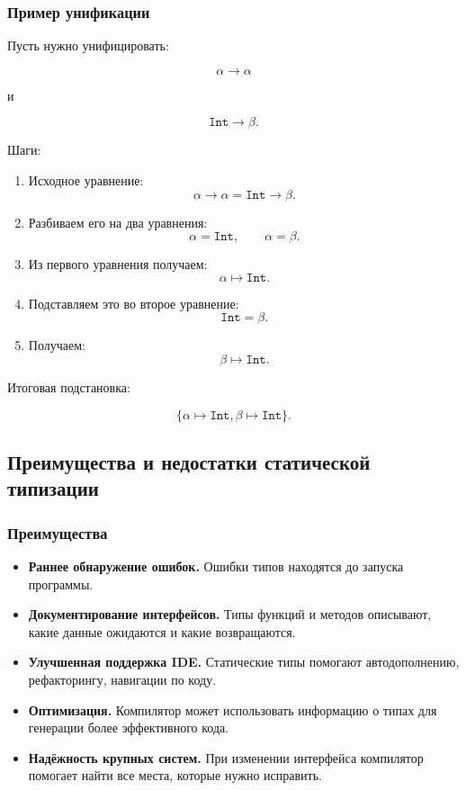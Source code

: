 \documentclass[12pt,a4paper]{article}
\begin{document}
\subsubsection{Пример унификации}

Пусть нужно унифицировать:

\[
\alpha \to \alpha
\]

и

\[
\texttt{Int} \to \beta.
\]

Шаги:

\begin{enumerate}
    \item Исходное уравнение:
    \[
    \alpha \to \alpha = \texttt{Int} \to \beta.
    \]
    \item Разбиваем его на два уравнения:
    \[
    \alpha = \texttt{Int},
    \qquad
    \alpha = \beta.
    \]
    \item Из первого уравнения получаем:
    \[
    \alpha \mapsto \texttt{Int}.
    \]
    \item Подставляем это во второе уравнение:
    \[
    \texttt{Int} = \beta.
    \]
    \item Получаем:
    \[
    \beta \mapsto \texttt{Int}.
    \]
\end{enumerate}

Итоговая подстановка:

\[
\{\alpha \mapsto \texttt{Int}, \beta \mapsto \texttt{Int}\}.
\]

\subsection{Преимущества и недостатки статической типизации}

\subsubsection{Преимущества}

\begin{itemize}
    \item \textbf{Раннее обнаружение ошибок.}
    Ошибки типов находятся до запуска программы.

    \item \textbf{Документирование интерфейсов.}
    Типы функций и методов описывают, какие данные ожидаются и какие возвращаются.

    \item \textbf{Улучшенная поддержка IDE.}
    Статические типы помогают автодополнению, рефакторингу, навигации по коду.

    \item \textbf{Оптимизация.}
    Компилятор может использовать информацию о типах для генерации более эффективного
    кода.

    \item \textbf{Надёжность крупных систем.}
    При изменении интерфейса компилятор помогает найти все места, которые нужно
    исправить.
\end{itemize}
\end{document}
